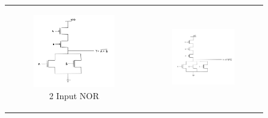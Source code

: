 \documentclass[conference]{IEEEtran}
\begin{document}
\begin{figure}[H]
    \centering
    \begin{tabular}{cc}
        \begin{subfigure}{0.44\linewidth}
            \centering
            \includegraphics[width=\textwidth]{images/nor_cmos_circuit_diagram.png}
            \caption{2 Input NOR}
        \end{subfigure} &
        \begin{subfigure}{0.44\linewidth}
            \centering
            \includegraphics[width=\textwidth]{images/nor_3_cmos_circuit_diagram.png}

\end{subfigure}
\end{tabular}
\end{figure}
\end{document}
